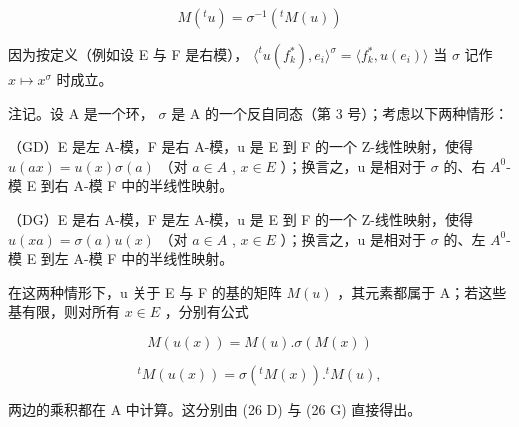 \[
M (^ {t} u) = \sigma^ {- 1} (^ {t} M (u))\tag{28}
\]

因为按定义（例如设 E 与 F 是右模）， \(\langle^t u(f_k^*), e_i \rangle^\sigma = \langle f_k^*, u(e_i) \rangle\) 当 \(\sigma\) 记作 \(x \mapsto x^\sigma\) 时成立。

注记。设 A 是一个环， \(\sigma\) 是 A 的一个反自同态（第 3 号）；考虑以下两种情形：

（GD）E 是左 A-模，F 是右 A-模，u 是 E 到 F 的一个 Z-线性映射，使得 \(u(ax) = u(x)\sigma(a)\) （对 \(a \in A\) , \(x \in E\) ）；换言之，u 是相对于 \(\sigma\) 的、右 \(A^{0}\)-模 E 到右 A-模 F 中的半线性映射。

（DG）E 是右 A-模，F 是左 A-模，u 是 E 到 F 的一个 Z-线性映射，使得 \(u(xa) = \sigma(a)u(x)\) （对 \(a \in A\) , \(x \in E\) ）；换言之，u 是相对于 \(\sigma\) 的、左 \(A^{0}\)-模 E 到左 A-模 F 中的半线性映射。

在这两种情形下，u 关于 E 与 F 的基的矩阵 \(M(u)\) ，其元素都属于 A；若这些基有限，则对所有 \(x \in E\) ，分别有公式

\[
M (u (x)) = M (u). \sigma (M (x))\tag{17 GD}
\]

\[
{ } ^ { t } M ( u ( x ) ) = \sigma ( { } ^ { t } M ( x ) ) . { } ^ { t } M ( u ) ,\tag{17 DG}
\]

两边的乘积都在 A 中计算。这分别由 (26 D) 与 (26 G) 直接得出。

